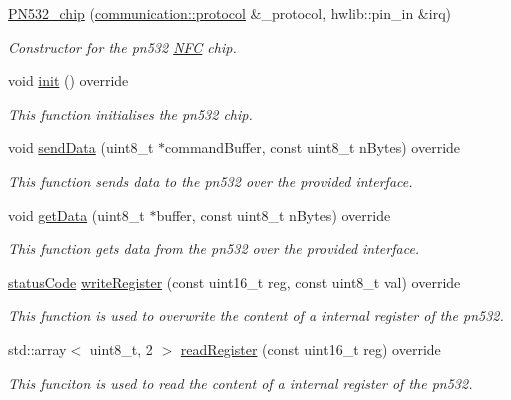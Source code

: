 \begin{DoxyCompactItemize}
\item 
\hyperlink{classnfc_1_1PN532__chip_afbdb5e54a580824290c6761db92d460e}{P\+N532\+\_\+chip} (\hyperlink{classcommunication_1_1protocol}{communication\+::protocol} \&\+\_\+protocol, hwlib\+::pin\+\_\+in \&irq)
\begin{DoxyCompactList}\small\item\em Constructor for the pn532 \hyperlink{classnfc_1_1NFC}{N\+FC} chip. \end{DoxyCompactList}\item 
void \hyperlink{classnfc_1_1PN532__chip_ab2eecf84902eedff7e7b5fae0c562804}{init} () override
\begin{DoxyCompactList}\small\item\em This function initialises the pn532 chip. \end{DoxyCompactList}\item 
void \hyperlink{classnfc_1_1PN532__chip_aab53fb1c9fced99ce154ab035f795302}{send\+Data} (uint8\+\_\+t $\ast$command\+Buffer, const uint8\+\_\+t n\+Bytes) override
\begin{DoxyCompactList}\small\item\em This function sends data to the pn532 over the provided interface. \end{DoxyCompactList}\item 
void \hyperlink{classnfc_1_1PN532__chip_ae8414552a504fec6b62ad0be140e53e0}{get\+Data} (uint8\+\_\+t $\ast$buffer, const uint8\+\_\+t n\+Bytes) override
\begin{DoxyCompactList}\small\item\em This function gets data from the pn532 over the provided interface. \end{DoxyCompactList}\item 
\hyperlink{declarations_8h_ae1d20c5a38cae82ccaa6a77be3fd264b}{status\+Code} \hyperlink{classnfc_1_1PN532__chip_a2b82f8ed84c6a9b4a7f0c1ad699c13a7}{write\+Register} (const uint16\+\_\+t reg, const uint8\+\_\+t val) override
\begin{DoxyCompactList}\small\item\em This function is used to overwrite the content of a internal register of the pn532. \end{DoxyCompactList}\item 
std\+::array$<$ uint8\+\_\+t, 2 $>$ \hyperlink{classnfc_1_1PN532__chip_a7c3e596337bced5394689396d201bc13}{read\+Register} (const uint16\+\_\+t reg) override
\begin{DoxyCompactList}\small\item\em This funciton is used to read the content of a internal register of the pn532. \end{DoxyCompactList}\item 

\end{DoxyCompactItemize}
